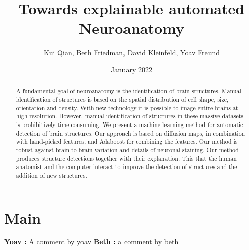 \documentclass[runningheads]{llncs}
\title{Towards explainable automated Neuroanatomy}
\author{Kui Qian, Beth Friedman, David Kleinfeld, Yoav Freund}
\date{January 2022}
\newcommand{\comment}[3]{{\color{#1} {\bf #2 :} #3}}
\newcommand{\yoav}[1]{\comment{purple}{Yoav}{#1}}
\renewcommand{\beth}[1]{\comment{red}{Beth}{#1}}
\begin{document}
\maketitle

\begin{abstract}
  A fundamental goal of neuroanatomy is the identification of brain
  structures.  Manual identification of structures is based on the
  spatial distribution of cell shape, size, orientation and density.
  With new technology it is possible to image entire brains at high
  resolution.  However, manual identification of structures in these
  massive datasets is prohibitively time consuming.  We present a
  machine learning method for automatic detection of brain
  structures. Our approach is based on diffusion maps, in combination
  with hand-picked features, and Adaboost for combining the
  features. Our method is robust against brain to brain variation and
  details of neuronal staining.  Our method produces structure
  detections together with their explanation. This that the human
  anatomist and the computer interact to improve the detection of
  structures and the addition of new structures.
  
\end{abstract}

\section{Main}

\yoav{A comment by yoav}
\beth{a comment by beth}
\end{document}
